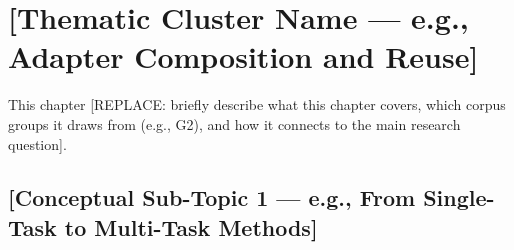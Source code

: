 %
%

\section{[Thematic Cluster Name — e.g., Adapter Composition and Reuse]}
\label{sec:lit_cluster_N}

This chapter [REPLACE: briefly describe what this chapter covers, which corpus
groups it draws from (e.g., G2), and how it connects to the main research question].

\subsection{[Conceptual Sub-Topic 1 — e.g., From Single-Task to Multi-Task Methods]}
\label{sec:lit_cluster_N:subtopic1}


